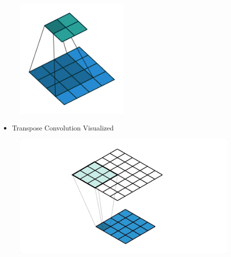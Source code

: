 \documentclass{report}
\begin{document}
\begin{figure}[H]
    \centering
    \includegraphics[width=0.5\textwidth]{.././assets/8.15.gif}
\end{figure}

\begin{itemize}
    \item Transpose Convolution Visualized
\end{itemize}

\begin{figure}[H]
    \centering
    \includegraphics[width=1.0\textwidth]{.././assets/8.16.gif}
\end{figure}
\end{document}
